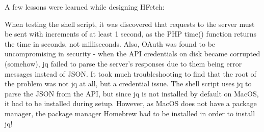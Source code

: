 A few lessons were learned while designing HFetch:

When testing the shell script, it was discovered that requests to the server must be sent with increments of at least 1 second, as the PHP time() function returns the time in seconds, not milliseconds.
Also, OAuth was found to be uncompromising in security - when the API credentials on disk became corrupted (somehow), jq\cite{jq} failed to parse the server's responses due to them being error messages instead of JSON. It took much troubleshooting to find that the root of the problem was not jq at all, but a credential issue.
The shell script uses jq to parse the JSON from the API, but since jq is not installed by default on MacOS, it had to be installed during setup.
However, as MacOS does not have a package manager, the package manager Homebrew had to be installed in order to install jq!